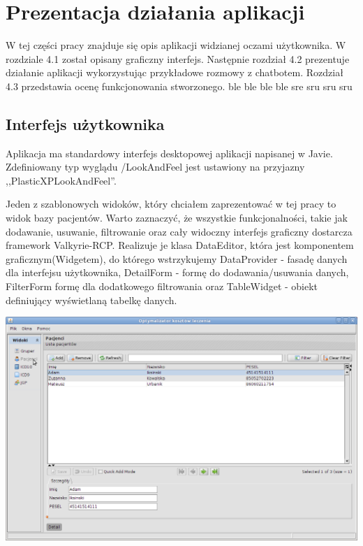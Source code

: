 \chapter{Prezentacja działania aplikacji}
\label{cha:prezentacja}

W tej części pracy znajduje się opis aplikacji widzianej oczami użytkownika. W rozdziale 4.1 został
opisany graficzny interfejs. Następnie rozdział 4.2 prezentuje działanie aplikacji wykorzystując przykładowe
rozmowy z chatbotem. Rozdział 4.3 przedstawia ocenę funkcjonowania stworzonego. ble ble ble ble sre sru sru sru


\section{Interfejs użytkownika}
\label{sec:interfejsUzytkownika}
Aplikacja ma standardowy interfejs desktopowej aplikacji napisanej w Javie. Zdefiniowany typ wyglądu /LookAndFeel jest ustawiony na przyjazny ,,PlasticXPLookAndFeel''.

Jeden z szablonowych widoków, który chciałem zaprezentować w tej pracy to widok bazy pacjentów. Warto zaznaczyć, że wszystkie funkcjonalności, takie jak dodawanie, usuwanie, filtrowanie oraz cały widoczny interfejs graficzny dostarcza framework Valkyrie-RCP. Realizuje je klasa DataEditor, która jest komponentem graficznym(Widgetem), do którego wstrzykujemy DataProvider - fasadę danych dla interfejsu użytkownika, DetailForm - formę do dodawania/usuwania danych, FilterForm formę dla dodatkowego filtrowania oraz TableWidget - obiekt definiujący wyświetlaną tabelkę danych.

\includegraphics[scale=0.4]{images/patient} 

